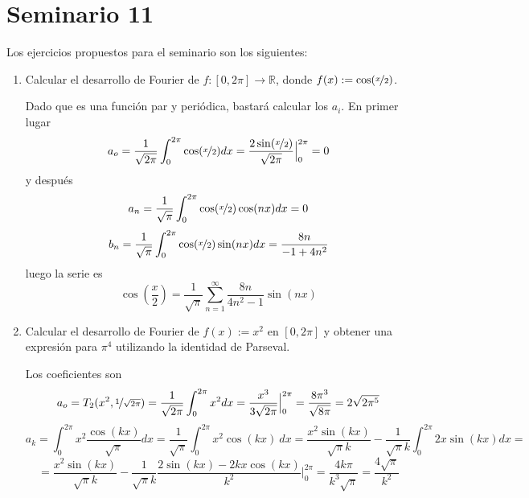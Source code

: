  \section{Seminario 11}
 Los ejercicios propuestos para el seminario son los siguientes:
\begin{enumerate}
    \item Calcular el desarrollo de Fourier de $f : [0, 2\pi] \longrightarrow \mathbb R$, donde $f(x) := \cos(\nicefrac{x}{2})$.
    \begin{sol}
        Dado que es una función par y periódica, bastará calcular los $a_i$. En primer lugar
        $$a_o=\dfrac{1}{\sqrt{2\pi}}\int_0^{2\pi} \cos(\nicefrac{x}{2}) dx = \dfrac{2 \sin(\nicefrac{x}{2})}{\sqrt{2\pi}} \Big|_{0}^{2\pi}=0$$
        y después
        $$a_n=\dfrac{1}{\sqrt{\pi}}\int_0^{2\pi} \cos(\nicefrac{x}{2}) \cos(nx) dx = 0$$
        $$b_n=\dfrac{1}{\sqrt{\pi}}\int_0^{2\pi} \cos(\nicefrac{x}{2}) \sin(nx) dx = \dfrac{8 n }{-1 + 4 n^2}$$
        luego la serie es 
        $$\cos\left(\dfrac{x}{2} \right)=\dfrac{1}{\sqrt{\pi}}\sum_{n=1}^{\infty} \dfrac{8 n }{ 4 n^2-1} \sin(nx)$$
    \end{sol}
    \item Calcular el desarrollo de Fourier de $f(x) := x^2$ en $[0, 2\pi]$ y obtener una expresión para $\pi^4$ utilizando la identidad de Parseval.
    \begin{sol} Los coeficientes son
        $$a_o=T_2(x^2,\nicefrac{1}{\sqrt{2\pi}})= \dfrac{1}{\sqrt{2\pi}} \int_0^{2\pi} x^2 dx=\dfrac{x^3}{3\sqrt{2\pi}} \Big|_0^{2\pi}=\dfrac{8 \pi^3}{\sqrt{8\pi}}=2\sqrt{2\pi^5}$$
            $$a_k=\int_0^{2 \pi} x^2 \dfrac{\cos(kx)}{\sqrt{\pi}} dx = \dfrac{1}{\sqrt{\pi}}\int_0^{2 \pi} x^2 \cos(kx) \: dx = \dfrac{x^2 \sin(kx)}{\sqrt{\pi}k}-\dfrac{1}{\sqrt{\pi}k} \int_0^{2\pi} 2x \sin(kx) dx=$$
            $$= \dfrac{x^2 \sin(kx)}{\sqrt{\pi}k}-\dfrac{1}{\sqrt{\pi}k} \dfrac{2 \sin(k x) - 2 k x \cos(k x)}{k^2} \Big|_{0}^{2\pi} = \dfrac{4k\pi}{k^3 \sqrt{\pi}}=\dfrac{4\sqrt{\pi}}{k^2}$$


\end{sol}
\end{enumerate}
